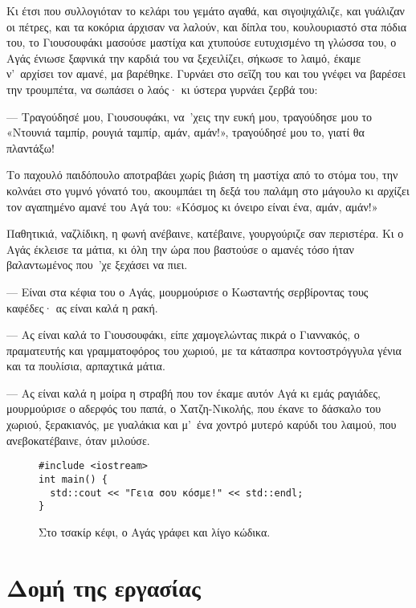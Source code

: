 \documentclass[diploma]{softlab-thesis}
\begin{document}
Κι έτσι που συλλογιόταν το κελάρι του γεμάτο αγαθά, και σιγοψιχάλιζε, και
γυάλιζαν οι πέτρες, και τα κοκόρια άρχισαν να λαλούν, και δίπλα του,
κουλουριαστό στα πόδια του, το Γιουσουφάκι μασούσε μαστίχα και χτυπούσε
ευτυχισμένο τη γλώσσα του, ο Αγάς ένιωσε ξαφνικά την καρδιά του να
ξεχειλίζει, σήκωσε το λαιμό, έκαμε ν’~αρχίσει τον αμανέ, μα
βαρέθηκε. Γυρνάει στο σεΐζη του και του γνέφει να βαρέσει την τρουμπέτα, να
σωπάσει ο λαός· κι ύστερα γυρνάει ζερβά του:

--- Τραγούδησέ μου, Γιουσουφάκι, να~’χεις την ευκή μου, τραγούδησε μου το
«Ντουνιά ταμπίρ, ρουγιά ταμπίρ, αμάν, αμάν!», τραγούδησέ μου το, γιατί θα
πλαντάξω!

Το παχουλό παιδόπουλο αποτραβάει χωρίς βιάση τη μαστίχα από το στόμα του,
την κολνάει στο γυμνό γόνατό του, ακουμπάει τη δεξά του παλάμη στο μάγουλο
κι αρχίζει τον αγαπημένο αμανέ του Αγά του: «Κόσμος κι όνειρο είναι ένα,
αμάν, αμάν!»

Παθητικιά, ναζλίδικη, η φωνή ανέβαινε, κατέβαινε, γουργούριζε σαν
περιστέρα. Κι ο Αγάς έκλεισε τα μάτια, κι όλη την ώρα που βαστούσε ο αμανές
τόσο ήταν βαλαντωμένος που~’χε ξεχάσει να πιει.

--- Είναι στα κέφια του ο Αγάς, μουρμούρισε ο Κωσταντής σερβίροντας τους
καφέδες· ας είναι καλά η ρακή.

--- Ας είναι καλά το Γιουσουφάκι, είπε χαμογελώντας πικρά ο Γιαννακός, ο
πραματευτής και γραμματοφόρος του χωριού, με τα κάτασπρα κοντοστρόγγυλα
γένια και τα πουλίσια, αρπαχτικά μάτια.

--- Ας είναι καλά η μοίρα η στραβή που τον έκαμε αυτόν Αγά κι εμάς ραγιάδες,
μουρμούρισε ο αδερφός του παπά, ο Χατζη-Νικολής, που έκανε το δάσκαλο του
χωριού, ξερακιανός, με γυαλάκια και μ’~ένα χοντρό μυτερό καρύδι του λαιμού,
που ανεβοκατέβαινε, όταν μιλούσε.

\begin{figure}[t]
\setlength\partopsep{-\topsep}%
\begin{verbatim}
#include <iostream>
int main() {
  std::cout << "Γεια σου κόσμε!" << std::endl;
}
\end{verbatim}
\caption{Στο τσακίρ κέφι, ο Αγάς γράφει και λίγο κώδικα.%
  \label{fig:hello-greek}}
\end{figure}


\section{Δομή της εργασίας}
\end{document}
